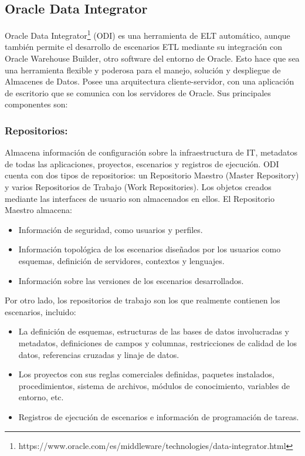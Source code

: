 \subsection{Oracle Data Integrator}

Oracle Data Integrator\footnote{https://www.oracle.com/es/middleware/technologies/data-integrator.html} (ODI) 
es una herramienta de ELT automático, aunque también permite el desarrollo de escenarios 
ETL mediante su integración con Oracle Warehouse Builder, otro software del entorno de Oracle. Esto hace que sea una 
herramienta flexible y poderosa para el manejo, solución y despliegue de Almacenes de Datos. Posee una arquitectura 
cliente-servidor, con una aplicación de escritorio que se comunica con los servidores de Oracle. Sus principales 
componentes son: 

\subsubsection{Repositorios:} 
Almacena información de configuración sobre la infraestructura de IT, metadatos de todas las aplicaciones, proyectos, 
escenarios y registros de ejecución. ODI cuenta con dos tipos de repositorios: un Repositorio Maestro (Master Repository) 
y varios Repositorios de Trabajo (Work Repositories). Los objetos creados mediante las interfaces de usuario son almacenados 
en ellos. El Repositorio Maestro almacena:

\begin{itemize}
    \item Información de seguridad, como usuarios y perfiles.
    \item Información topológica de los escenarios diseñados por los usuarios como esquemas, definición de servidores, 
        contextos y lenguajes.
    \item Información sobre las versiones de los escenarios desarrollados.
\end{itemize}

Por otro lado, los repositorios de trabajo son los que realmente 
contienen los escenarios, incluido: 

\begin{itemize}
    \item La definición de esquemas, estructuras de las bases de datos involucradas y metadatos, 
        definiciones de campos y columnas, restricciones de calidad de los datos, referencias cruzadas y linaje de datos.
    \item Los proyectos con sus reglas comerciales definidas, paquetes instalados, procedimientos, 
        sistema de archivos, módulos de conocimiento, variables de entorno, etc.
    \item Registros de ejecución de escenarios e información de programación de tareas.
\end{itemize}


